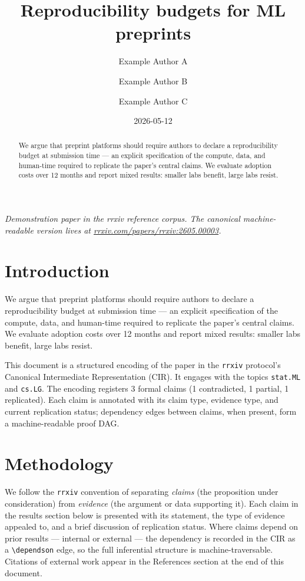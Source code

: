 \documentclass{rrxiv}
\title{Reproducibility budgets for ML preprints}
\author{Example Author A \and Example Author B \and Example Author C}
\date{2026-05-12}
\begin{document}
\maketitle

\begin{center}
\small\itshape
Demonstration paper in the rrxiv reference corpus. The canonical machine-readable version lives at \href{https://rrxiv.com/papers/rrxiv:2605.00003}{rrxiv.com/papers/rrxiv:2605.00003}.
\end{center}

\begin{abstract}
We argue that preprint platforms should require authors to declare a reproducibility budget at submission time — an explicit specification of the compute, data, and human-time required to replicate the paper's central claims. We evaluate adoption costs over 12 months and report mixed results: smaller labs benefit, large labs resist.
\end{abstract}

\section{Introduction}
We argue that preprint platforms should require authors to declare a reproducibility budget at submission time — an explicit specification of the compute, data, and human-time required to replicate the paper's central claims. We evaluate adoption costs over 12 months and report mixed results: smaller labs benefit, large labs resist.

This document is a structured encoding of the paper in the \texttt{rrxiv} protocol's Canonical Intermediate Representation (CIR). It engages with the topics \texttt{stat.ML} and \texttt{cs.LG}. The encoding registers 3 formal claims (1 contradicted, 1 partial, 1 replicated). Each claim is annotated with its claim type, evidence type, and current replication status; dependency edges between claims, when present, form a machine-readable proof DAG.

\section{Methodology}
We follow the \texttt{rrxiv} convention of separating \emph{claims} (the proposition under consideration) from \emph{evidence} (the argument or data supporting it). Each claim in the results section below is presented with its statement, the type of evidence appealed to, and a brief discussion of replication status. Where claims depend on prior results --- internal or external --- the dependency is recorded in the CIR as a \texttt{\textbackslash dependson} edge, so the full inferential structure is machine-traversable. Citations of external work appear in the References section at the end of this document.
\end{document}
